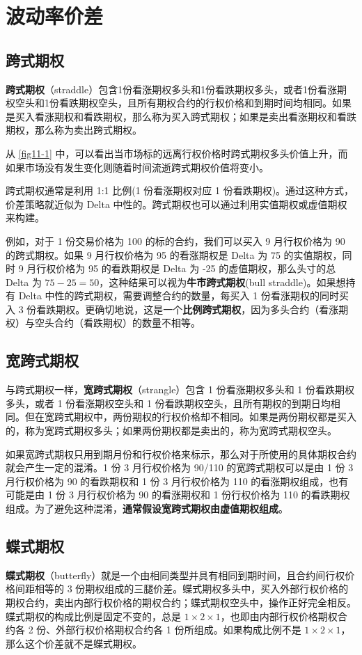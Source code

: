 \chapter{波动率价差}
\section{跨式期权}
\textbf{跨式期权}（straddle）包含1份看涨期权多头和1份看跌期权多头，或者1份看涨期权空头和1份看跌期权空头，且所有期权合约的行权价格和到期时间均相同。如果是买入看涨期权和看跌期权，那么称为买入跨式期权；如果是卖出看涨期权和看跌期权，那么称为卖出跨式期权。

从 \autoref{fig11-1} 中，可以看出当市场标的远离行权价格时跨式期权多头价值上升，而如果市场没有发生变化则随着时间流逝跨式期权价值将变小。

跨式期权通常是利用 1:1 比例(1 份看涨期权对应 1 份看跌期权)。通过这种方式，价差策略就近似为 Delta 中性的。跨式期权也可以通过利用实值期权或虚值期权来构建。

例如，对于 1 份交易价格为 100 的标的合约，我们可以买入 9 月行权价格为 90 的跨式期权。如果 9 月行权价格为 95 的看涨期权是 Delta 为 75 的实值期权，同时 9 月行权价格为 95 的看跌期权是 Delta 为 -25 的虚值期权，那么头寸的总 Delta 为 $75-25=50$，这种结果可以视为\textbf{牛市跨式期权}(bull straddle)。如果想持有 Delta 中性的跨式期权，需要调整合约的数量，每买入 1 份看涨期权的同时买入 3 份看跌期权。更确切地说，这是一个\textbf{比例跨式期权}，因为多头合约（看涨期权）与空头合约（看跌期权）的数量不相等。
\section{宽跨式期权}
与跨式期权一样，\textbf{宽跨式期权}（strangle）包含 1 份看涨期权多头和 1 份看跌期权多头，或者 1 份看涨期权空头和 1 份看跌期权空头，且所有期权的到期日均相同。但在宽跨式期权中，两份期权的行权价格却不相同。如果是两份期权都是买入的，称为宽跨式期权多头；如果两份期权都是卖出的，称为宽跨式期权空头。

如果宽跨式期权只用到期月份和行权价格来标示，那么对于所使用的具体期权合约就会产生一定的混淆。1 份 3 月行权价格为 90/110 的宽跨式期权可以是由 1 份 3 月行权价格为 90 的看跌期权和 1 份 3 月行权价格为 110 的看涨期权组成，也有可能是由 1 份 3 月行权价格为 90 的看涨期权和 1 份行权价格为 110 的看跌期权组成。为了避免这种混淆，\textbf{通常假设宽跨式期权由虚值期权组成}。

\section{蝶式期权}
\textbf{蝶式期权}（butterfly）就是一个由相同类型并具有相同到期时间，且合约间行权价格间距相等的 3 份期权组成的三腿价差。蝶式期权多头中，买入外部行权价格的期权合约，卖出内部行权价格的期权合约；蝶式期权空头中，操作正好完全相反。蝶式期权的构成比例是固定不变的，总是 $1\times 2\times 1$，也即由内部行权价格期权合约各 2 份、外部行权价格期权合约各 1 份所组成。如果构成比例不是 $1\times 2\times 1$，那么这个价差就不是蝶式期权。

